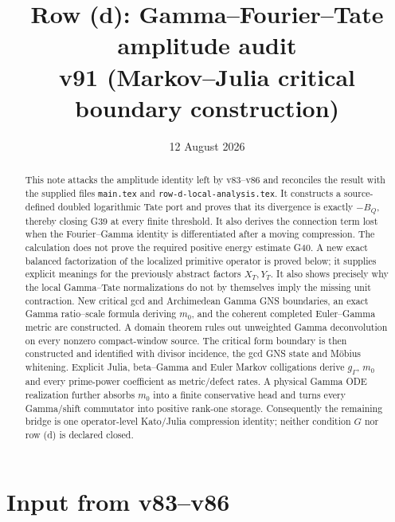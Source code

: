 \documentclass[11pt]{article}
\title{Row (d): Gamma--Fourier--Tate amplitude audit\\
v91 (Markov--Julia critical boundary construction)}
\author{}
\date{12 August 2026}
\begin{document}
\maketitle

\begin{abstract}
This note attacks the amplitude identity left by v83--v86 and reconciles the
result with the supplied files \texttt{main.tex} and
\texttt{row-d-local-analysis.tex}.  It constructs a
source-defined doubled logarithmic Tate port and proves that its divergence is
exactly $-B_Q$, thereby closing G39 at every finite threshold.  It also derives
the connection term lost when the Fourier--Gamma identity is differentiated
after a moving compression.  The calculation does not prove the required
positive energy estimate G40.  A new exact balanced factorization of the
localized primitive operator is proved below; it supplies explicit meanings
for the previously abstract factors $X_T,Y_T$.  It also shows precisely why
the local Gamma--Tate normalizations do not by themselves imply the missing
unit contraction.  New critical gcd and Archimedean Gamma GNS boundaries,
an exact Gamma ratio--scale formula deriving $m_0$, and the coherent completed
Euler--Gamma metric are constructed.  A domain theorem rules out unweighted
Gamma deconvolution on every nonzero compact-window source.  The critical
form boundary is then constructed and identified with divisor incidence, the
gcd GNS state and M\"obius whitening.  Explicit Julia, beta--Gamma and Euler
Markov colligations derive $g_\Gamma$, $m_0$ and every prime-power coefficient
as metric/defect rates.  A physical Gamma ODE realization further absorbs
$m_0$ into a finite conservative head and turns every Gamma/shift commutator
into positive rank-one storage.  Consequently the remaining bridge is one
operator-level Kato/Julia compression identity; neither condition $G$ nor
row (d) is declared closed.
\end{abstract}

\section{Input from v83--v86}
\end{document}
